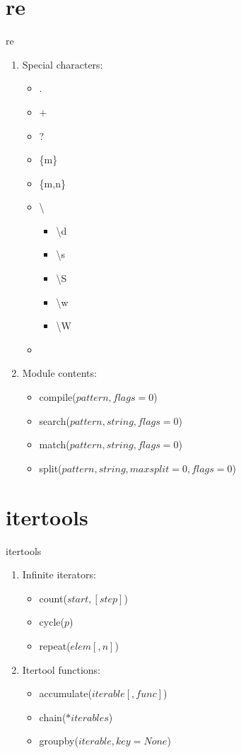 \documentclass[xcolor=table]{mysld}
\begin{document}
\section{re}
\begin{frame}[allowframebreaks]{re}
\begin{enumerate}
\item Special characters:
\begin{itemize}
\item .
\item +
\item ?
\item \{m\}
\item \{m,n\}
\item \textbackslash
\begin{itemize}
\item \textbackslash d
\item \textbackslash s
\item \textbackslash S
\item \textbackslash w
\item \textbackslash W
\end{itemize}
\item [ ]
\end{itemize}
\framebreak
\item Module contents:
\begin{itemize}
\item compile($pattern, flags=0$)
\item search($pattern, string, flags=0$)
\item match($pattern, string, flags=0$)
\item split($pattern, string, maxsplit=0, flags=0$)
\end{itemize}
\end{enumerate}
\end{frame}

\section{itertools}
\begin{frame}{itertools}
\begin{enumerate}
\item Infinite iterators:
\begin{itemize}
\item count($start,[step]$)
\item cycle($p$)
\item repeat($elem [, n]$)
\end{itemize}
\item Itertool functions:
\begin{itemize}
\item accumulate($iterable[, func]$)
\item chain($*iterables$)
\item groupby($iterable, key=None$)
\end{itemize}
\end{enumerate}
\end{frame}
\end{document}
